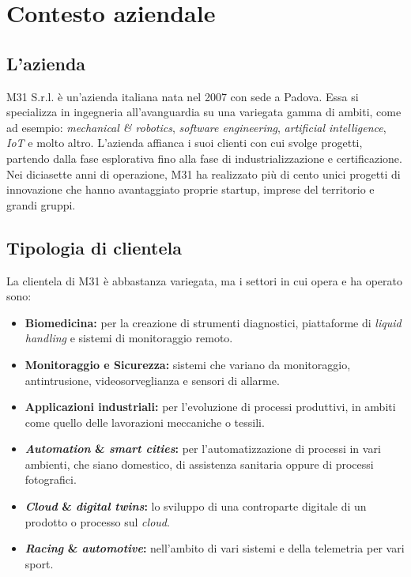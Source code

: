 \chapter{Contesto aziendale}
\label{chap:contesto-aziendale}

\section{L'azienda}\label{sec:the-company}\noindent
M31 S.r.l. è un'azienda italiana nata nel 2007 con sede a Padova.
Essa si specializza in ingegneria all'avanguardia su una variegata gamma di ambiti, come ad esempio: \textit{mechanical \& robotics}, \textit{software engineering}, \textit{artificial intelligence}, \textit{IoT} e molto altro.
L'azienda affianca i suoi clienti con cui svolge progetti, partendo dalla fase esplorativa fino alla fase di industrializzazione e certificazione.
Nei diciasette anni di operazione, M31 ha realizzato più di cento unici progetti di innovazione che hanno avantaggiato proprie startup, imprese del territorio e grandi gruppi.

\section{Tipologia di clientela}\label{sec:client-types}\noindent
La clientela di M31 è abbastanza variegata, ma i settori in cui opera e ha operato sono:
\begin{itemize}
    \item \textbf{Biomedicina:} per la creazione di strumenti diagnostici, piattaforme di \textit{liquid handling} e sistemi di monitoraggio remoto.
    \item \textbf{Monitoraggio e Sicurezza:} sistemi che variano da monitoraggio, antintrusione, videosorveglianza e sensori di allarme.
    \item \textbf{Applicazioni industriali:} per l'evoluzione di processi produttivi, in ambiti come quello delle lavorazioni meccaniche o tessili.
    \item \textbf{\textit{Automation} \& \textit{smart cities}:} per l'automatizzazione di processi in vari ambienti, che siano domestico, di assistenza sanitaria oppure di processi fotografici.
    \item \textbf{\textit{Cloud} \& \textit{digital twins}:} lo sviluppo di una controparte digitale di un prodotto o processo sul \textit{cloud}.
    \item \textbf{\textit{Racing} \& \textit{automotive}:} nell'ambito di vari sistemi e della telemetria per vari sport.
\end{itemize}

